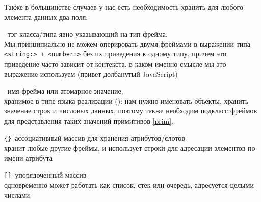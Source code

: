 Также в большинстве случаев у нас есть необходимость хранить для любого
элемента данных два поля:
\begin{description} \label{typeval}

\item[type]\ тэг класса/типа явно указывающий на тип фрейма.\\
Мы принципиально не можем оперировать двумя фреймами в выражении типа
\verb|<string:> + <number:>| без их приведения к одному типу, причем это
приведение часто зависит от контекста, в каком именно смысле мы это выражение
используем (привет долбанутый JavaScript)

\item[value]\ имя фрейма или атомарное значение,\\хранимое в типе языка
реализации (\py): нам нужно именовать объекты, хранить значение строк и числовых
данных, поэтому также необходим подкласс фреймов для представления таких
значений-примитивов \ref{prim}.

\item[attr]\verb|{}|\ ассоциативный массив для хранения атрибутов/слотов\\
хранит любые другие фреймы, и использует строки для адресации элементов по имени
атрибута

\item[nest]\verb|[]|\ упорядоченный массив\\
одновременно может работать как список, стек или очередь, адресуется целыми
числами

\end{description}

